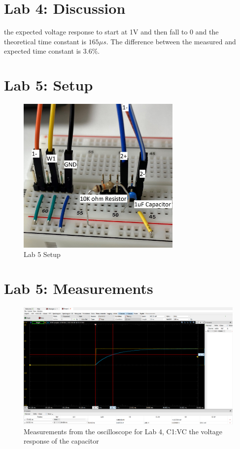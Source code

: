 \documentclass[12pt]{article}
\begin{document}
\section*{Lab 4: Discussion}
the expected voltage response to start at 1V and then fall to 0 and the theoretical time constant is $165\mu s$. The difference between the measured and expected time constant is $3.6\%$.
\pagebreak
\section*{Lab 5: Setup}
\begin{figure}[h]
\includegraphics[width=8cm]{Lab 5}
\centering
\caption{Lab 5 Setup}
\end{figure}
\section*{Lab 5: Measurements}
\begin{figure}[h]
\includegraphics[width=12cm]{Problem 5}
\centering
\caption{Measurements from the oscilloscope for Lab 4, C1:VC the voltage response of the capacitor}
\end{figure}
\pagebreak
\end{document}
